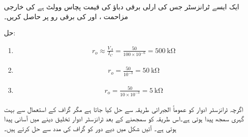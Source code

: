 ایک ایسے   ٹرانزسٹر جس کی ارلی برقی دباؤ کی قیمت پچاس وولٹ   ہے کی خارجی مزاحمت  ، اور   کی برقی رو پر حاصل کریں۔

حل:
\begin{enumerate}
\item
\begin{align*}
r_o \approx \frac{V_A}{I_C}=\frac{50}{100 \times 10^{-6}}=\SI{500}{\kilo \ohm}
\end{align*}

\item
\begin{align*}
r_o = \frac{50}{10^{-3}}=\SI{50}{\kilo \ohm}
\end{align*}

\item
\begin{align*}
r_o = \frac{50}{10 \times 10^{-3}}=\SI{5}{\kilo \ohm}
\end{align*}

\end{enumerate}

اگرچہ ٹرانزسٹر ادوار کو عموماً الجبرائی طریقہ سے حل کیا جاتا ہے مگر گراف کے استعمال سے بہت گہری سمجھ پیدا ہوتی ہے۔اس طریقہ کو سمجھنے کے بعد ٹرانزسٹر ادوار تخلیق دینے میں آسانی پیدا ہوتی ہے۔ آئیں شکل   میں دیے دور کو گراف کی مدد سے حل کرتے ہیں۔

